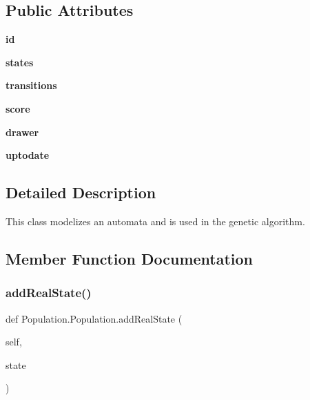 \subsection*{Public Attributes}
\begin{DoxyCompactItemize}
\item 
\mbox{\label{classPopulation_1_1Population_ab29c6819121e87b71410b52c822df985}} 
{\bfseries id}
\item 
\mbox{\label{classPopulation_1_1Population_a0b83d062dfe237329d27ee1dea3bc731}} 
{\bfseries states}
\item 
\mbox{\label{classPopulation_1_1Population_ad130501ec81092217e3d089af7c7350c}} 
{\bfseries transitions}
\item 
\mbox{\label{classPopulation_1_1Population_a393ef2a9bec6f96f54a2713c3f09314a}} 
{\bfseries score}
\item 
\mbox{\label{classPopulation_1_1Population_a05bbbe452ca0870bc3408837f0993ec5}} 
{\bfseries drawer}
\item 
\mbox{\label{classPopulation_1_1Population_a1e1683d7a6c1f468f07a1a9114aaa3dc}} 
{\bfseries uptodate}
\end{DoxyCompactItemize}


\subsection{Detailed Description}
This class modelizes an automata and is used in the genetic algorithm. 



\subsection{Member Function Documentation}
\mbox{\label{classPopulation_1_1Population_a8c399aa1a35a6a1381bbe9027c6ed289}} 
\subsubsection{\texorpdfstring{addRealState()}{addRealState()}}
{\footnotesize\ttfamily def Population.\+Population.\+add\+Real\+State (\begin{DoxyParamCaption}\item[{}]{self,  }\item[{}]{state }\end{DoxyParamCaption})}




